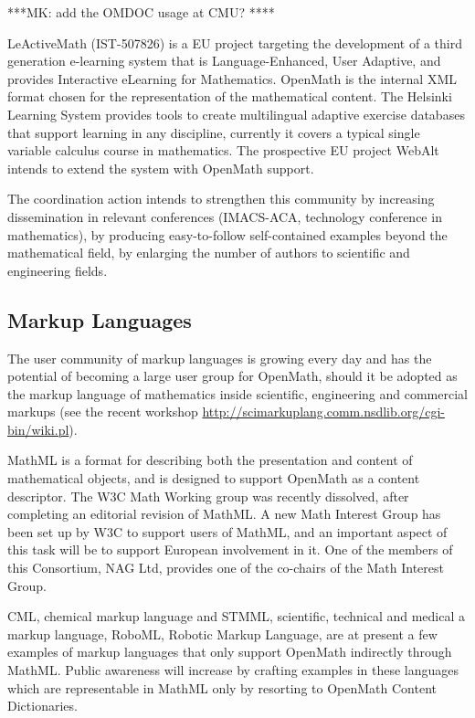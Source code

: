 \documentclass[draft]{artikel3}
\begin{document}
***MK: add the OMDOC usage at CMU? ****

LeActiveMath (IST-507826) is a EU project targeting the development of
a third generation e-learning system that is Language-Enhanced, User
Adaptive, and provides Interactive eLearning for Mathematics. OpenMath
is the internal XML format chosen for the representation of the
mathematical content.  The Helsinki Learning System provides tools to
create multilingual adaptive exercise databases that support learning
in any discipline, currently it covers a typical single variable
calculus course in mathematics. The prospective EU project WebAlt
intends to extend the system with OpenMath support.


The coordination action intends to strengthen this community by
increasing dissemination in relevant conferences (IMACS-ACA,
technology conference in mathematics), by producing easy-to-follow
self-contained examples beyond the mathematical field, by enlarging
the number of authors to scientific and engineering fields.


\subsection{Markup Languages}
\label{sec:ml}

The user community of markup languages is growing every day and has
the potential of becoming a large user group for OpenMath, should it
be adopted as the markup language of mathematics inside scientific,
engineering and commercial markups (see the recent workshop
\url{http://scimarkuplang.comm.nsdlib.org/cgi-bin/wiki.pl}).

MathML is a format for describing both the presentation and content of
mathematical objects, and is designed to support OpenMath as a content
descriptor.  The W3C Math Working group was recently dissolved, after
completing an editorial revision of MathML.  A new Math Interest Group
has been set up by W3C to support users of MathML, and an important
aspect of this task will be to support European involvement in it.
One of the members of this Consortium, NAG Ltd, provides one of the
co-chairs of the Math Interest Group.

CML, chemical markup language and STMML, scientific, technical and
medical a markup language, RoboML, Robotic Markup Language, are at
present a few examples of markup languages that only support OpenMath
indirectly through MathML.  Public awareness will increase by crafting
examples in these languages which are representable in MathML only by
resorting to OpenMath Content Dictionaries.
\end{document}
